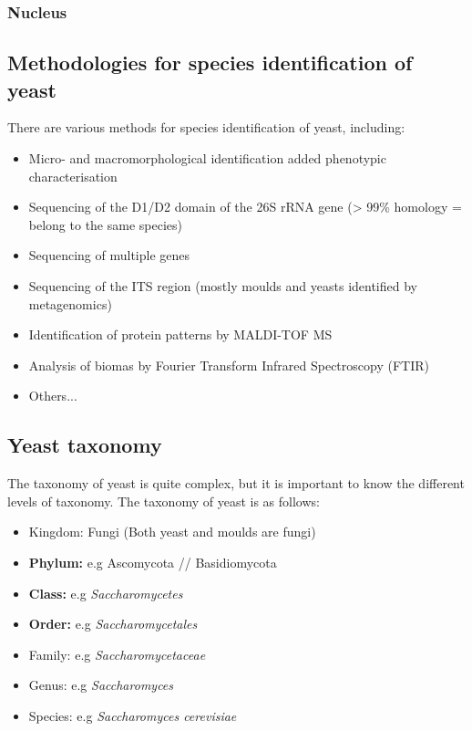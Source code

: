 \subsubsection*{Nucleus}

\subsection{Methodologies for species identification of yeast} 
There are various methods for species identification of yeast, including:
\begin{highlight}
    \begin{itemize}
        \item Micro- and macromorphological identification added phenotypic characterisation
        \item Sequencing of the D1/D2 domain of the 26S rRNA gene (> 99\% homology = belong to the same species)
        \item Sequencing of multiple genes
        \item Sequencing of the ITS region (mostly moulds and yeasts identified by metagenomics)
        \item Identification of protein patterns by MALDI-TOF MS
        \item Analysis of biomas by Fourier Transform Infrared Spectroscopy (FTIR)
        \item Others...
    \end{itemize}
\end{highlight}

\subsection{Yeast taxonomy}
The taxonomy of yeast is quite complex, but it is important to know the different levels of taxonomy. The taxonomy of yeast is as follows:
\begin{highlight}
    \begin{itemize}
        \item Kingdom: Fungi (Both yeast and moulds are fungi)
        \item \textbf{Phylum:} e.g Ascomycota // Basidiomycota
        \item \textbf{Class:} e.g \textit{Saccharomycetes}
        \item \textbf{Order:} e.g \textit{Saccharomycetales}
        \item Family: e.g \textit{Saccharomycetaceae}
        \item Genus: e.g \textit{Saccharomyces}
        \item Species: e.g \textit{Saccharomyces 
        cerevisiae}    

    \end{itemize}
\end{highlight}

